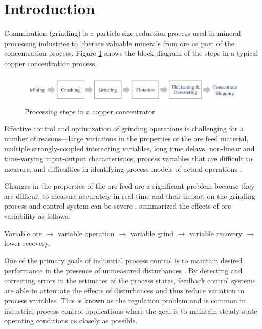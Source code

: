 \chapter*{Introduction}         %
\label{chap-introduction}       %


Comminution (grinding) is a particle size reduction process used in mineral processing industries to liberate valuable minerals from ore as part of the concentration process. Figure \ref{fig:process-block-diagram} shows the block diagram of the steps in a typical copper concentration process.

\begin{figure}[htp]
	\centering
	\includegraphics[width=15cm]{images/process_block_diagram.pdf}
	\caption{Processing steps in a copper concentrator} \label{fig:process-block-diagram}
\end{figure}

Effective control and optimization of grinding operations is challenging for a number of reasons---large variations in the properties of the ore feed material, multiple strongly-coupled interacting variables, long time delays, non-linear and time-varying input-output characteristics, process variables that are difficult to measure, and difficulties in identifying process models of actual operations \citep{olivier_dual_2012, gough_sag_2015, le_roux_throughput_2016, aguila-camacho_control_2017}. 

Changes in the properties of the ore feed are a significant problem because they are difficult to measure accurately in real time and their impact on the grinding process and control system can be severe \citep{herbst_optimal_1988, cesar_multivariable_2009, remes_grinding_2010, liu_development_2018}. \cite{powell_applying_2009} summarized the effects of ore variability as follows:

Variable ore $\to$ variable operation $\to$ variable grind $\to$ variable recovery $\to$ lower recovery. 

One of the primary goals of industrial process control is to maintain desired performance in the presence of unmeasured disturbances \citep{astrom_computer_1997}. By detecting and correcting errors in the estimates of the process states, feedback control systems are able to attenuate the effects of disturbances and thus reduce variation in process variables. This is known as the regulation problem and is common in industrial process control applications where the goal is to maintain steady-state operating conditions as closely as possible.

